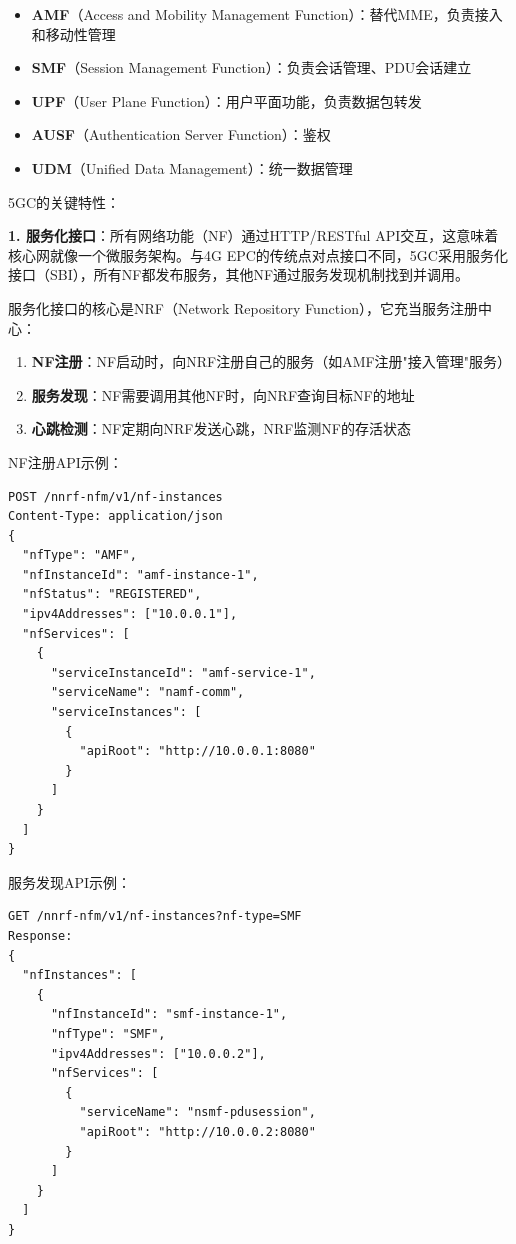 \begin{itemize}
    \item \textbf{AMF}（Access and Mobility Management Function）：替代MME，负责接入和移动性管理
    \item \textbf{SMF}（Session Management Function）：负责会话管理、PDU会话建立
    \item \textbf{UPF}（User Plane Function）：用户平面功能，负责数据包转发
    \item \textbf{AUSF}（Authentication Server Function）：鉴权
    \item \textbf{UDM}（Unified Data Management）：统一数据管理
\end{itemize}

5GC的关键特性：

\textbf{1. 服务化接口}：所有网络功能（NF）通过HTTP/RESTful API交互，这意味着核心网就像一个微服务架构。与4G EPC的传统点对点接口不同，5GC采用服务化接口（SBI），所有NF都发布服务，其他NF通过服务发现机制找到并调用。

服务化接口的核心是NRF（Network Repository Function），它充当服务注册中心：

\begin{enumerate}
    \item \textbf{NF注册}：NF启动时，向NRF注册自己的服务（如AMF注册"接入管理"服务）
    \item \textbf{服务发现}：NF需要调用其他NF时，向NRF查询目标NF的地址
    \item \textbf{心跳检测}：NF定期向NRF发送心跳，NRF监测NF的存活状态
\end{enumerate}

NF注册API示例：

\begin{verbatim}
POST /nnrf-nfm/v1/nf-instances
Content-Type: application/json
{
  "nfType": "AMF",
  "nfInstanceId": "amf-instance-1",
  "nfStatus": "REGISTERED",
  "ipv4Addresses": ["10.0.0.1"],
  "nfServices": [
    {
      "serviceInstanceId": "amf-service-1",
      "serviceName": "namf-comm",
      "serviceInstances": [
        {
          "apiRoot": "http://10.0.0.1:8080"
        }
      ]
    }
  ]
}
\end{verbatim}

服务发现API示例：

\begin{verbatim}
GET /nnrf-nfm/v1/nf-instances?nf-type=SMF
Response:
{
  "nfInstances": [
    {
      "nfInstanceId": "smf-instance-1",
      "nfType": "SMF",
      "ipv4Addresses": ["10.0.0.2"],
      "nfServices": [
        {
          "serviceName": "nsmf-pdusession",
          "apiRoot": "http://10.0.0.2:8080"
        }
      ]
    }
  ]
}
\end{verbatim}

